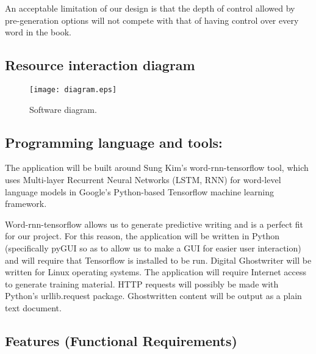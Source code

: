 \documentclass[12pt]{article}
\begin{document}
An acceptable limitation of our design is that the depth of control allowed by pre-generation options will not compete with that of having control over every word in the book.


\subsection{Resource interaction diagram}

\begin{figure}[h]
  \centering
    \texttt{[image: diagram.eps]}
    \caption{Software diagram.}
    \label{fig:Software diagram.}
\end{figure}

\subsection{Programming language and tools:}

The application will be built around Sung Kim's word-rnn-tensorflow tool, which uses Multi-layer Recurrent Neural Networks (LSTM, RNN) for word-level language models in Google's Python-based Tensorflow machine learning framework.\cite{WordRNNTensorflow}

Word-rnn-tensorflow allows us to generate predictive writing and is a perfect fit for our project. For this reason, the application will be written in Python (specifically pyGUI so as to allow us to make a GUI for easier user interaction) and will require that Tensorflow is installed to be run. Digital Ghostwriter will be written for Linux operating systems. The application will require Internet access to generate training material. HTTP requests will possibly be made with Python's urllib.request package. Ghostwritten content will be output as a plain text document.

\subsection{Features (Functional Requirements)}
\end{document}
